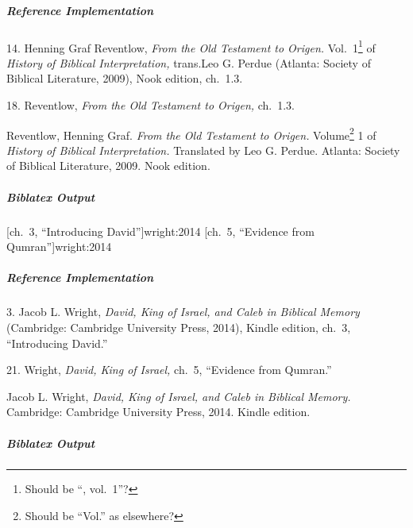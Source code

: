 \documentclass[a4paper]{article}
\newenvironment{biboutput}{%
  \subparagraph{Biblatex Output}
}{\color{black}}
\newenvironment{refimp}{%
  \subparagraph{Reference Implementation}
  \color{reference-colour}
  \rm
}{\par\color{black}}
\begin{document}
\begin{refimp}
  \hspace*{\bibindent}14. Henning Graf Reventlow, \emph{From the Old Testament
  to Origen.} Vol.~1\footnote{Should be “, vol.~1”?} of \emph{History of
  Biblical Interpretation,} trans.\@ Leo G. Perdue (Atlanta: Society of
  Biblical Literature, 2009), Nook edition, ch.~1.3.

  \hspace*{\bibindent}18. Reventlow, \emph{From the Old Testament to Origen,}
  ch.~1.3.
  
  \hangindent\bibindent Reventlow, Henning Graf. \emph{From the Old Testament
  to Origen.} Volume\footnote{Should be “Vol.” as elsewhere?} 1 of
  \emph{History of Biblical Interpretation.} Translated by Leo G. Perdue.
  Atlanta: Society of Biblical Literature, 2009. Nook edition.
\end{refimp}

\begin{biboutput}
  [ch.~3, \mkbibquote{Introducing David}]{wright:2014}
  [ch.~5, \mkbibquote{Evidence from Qumran}]{wright:2014}
\end{biboutput}

\begin{refimp}
  \hspace*{\bibindent}3. Jacob L. Wright, \emph{David, King of Israel, and
  Caleb in Biblical Memory} (Cambridge: Cambridge University Press, 2014),
  Kindle edition, ch.~3, “Introducing David.”

  \hspace*{\bibindent}21. Wright, \emph{David, King of Israel,} ch.~5,
  “Evidence from Qumran.”

  \hangindent\bibindent Jacob L. Wright, \emph{David, King of Israel, and
  Caleb in Biblical Memory.} Cambridge: Cambridge University Press, 2014.
  Kindle edition.
\end{refimp}

\begin{biboutput}
\end{biboutput}
\end{document}
